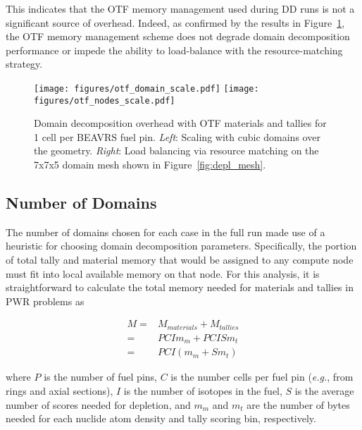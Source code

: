 \documentclass[12pt,twoside]{mitthesis-exec}
\begin{document}
This indicates that the OTF memory management used during DD runs is not a
significant source of overhead. Indeed, as confirmed by the results in
Figure~\ref{fig:otf_perf}, the OTF memory management scheme does not degrade
domain decomposition performance or impede the ability to load-balance with the
resource-matching strategy.


\begin{figure}[h!]
    \centering
    \texttt{[image: figures/otf\_domain\_scale.pdf]}
    \texttt{[image: figures/otf\_nodes\_scale.pdf]}
    \caption{Domain decomposition overhead with OTF materials and tallies for 1
    cell per BEAVRS fuel pin. \emph{Left}: Scaling with cubic domains over the
    geometry. \emph{Right}: Load balancing via resource matching on the 7x7x5
    domain mesh shown in Figure~\ref{fig:depl_mesh}. \label{fig:otf_perf}}
\end{figure}

\subsection*{Number of Domains}

The number of domains chosen for each case in the full run made use of a
heuristic for choosing domain decomposition parameters. Specifically, the
portion of total tally and material memory that would be assigned to any compute
node must fit into local available memory on that node. For this analysis, it
is straightforward to calculate the total memory needed for materials and
tallies in PWR problems as

\begin{equation}
  \begin{aligned}
    M =& M_{materials} + M_{tallies} \\
    =& P C I m_m + P C I S m_t \\
    =& P C I \left(m_m + S m_t\right)
  \end{aligned}
  \label{eqn:mem_req}
\end{equation}

\noindent where $P$ is the number of fuel pins, $C$ is the number cells per fuel
pin (\emph{e.g.}, from rings and axial sections), $I$ is the number of isotopes
in the fuel, $S$ is the average number of scores needed for depletion, and $m_m$
and $m_t$ are the number of bytes needed for each nuclide atom density and tally
scoring bin, respectively.
\end{document}
